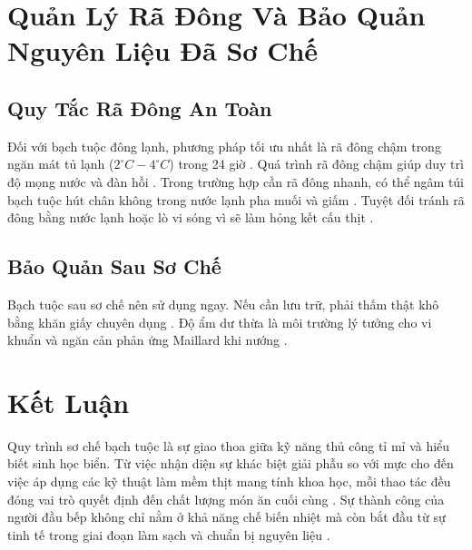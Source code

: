 \documentclass[12pt,a4paper]{report}
\begin{document}
\section{Quản Lý Rã Đông Và Bảo Quản Nguyên Liệu Đã Sơ Chế}

\subsection{Quy Tắc Rã Đông An Toàn}

Đối với bạch tuộc đông lạnh, phương pháp tối ưu nhất là rã đông chậm trong ngăn mát tủ lạnh ($2^\circ C - 4^\circ C$) trong 24 giờ \cite{ref4}. Quá trình rã đông chậm giúp duy trì độ mọng nước và đàn hồi \cite{ref4}. Trong trường hợp cần rã đông nhanh, có thể ngâm túi bạch tuộc hút chân không trong nước lạnh pha muối và giấm \cite{ref10}. Tuyệt đối tránh rã đông bằng nước lạnh hoặc lò vi sóng vì sẽ làm hỏng kết cấu thịt \cite{ref4}.

\subsection{Bảo Quản Sau Sơ Chế}

Bạch tuộc sau sơ chế nên sử dụng ngay. Nếu cần lưu trữ, phải thấm thật khô bằng khăn giấy chuyên dụng \cite{ref3}. Độ ẩm dư thừa là môi trường lý tưởng cho vi khuẩn và ngăn cản phản ứng Maillard khi nướng \cite{ref25}.

\section{Kết Luận}

Quy trình sơ chế bạch tuộc là sự giao thoa giữa kỹ năng thủ công tỉ mỉ và hiểu biết sinh học biển. Từ việc nhận diện sự khác biệt giải phẫu so với mực cho đến việc áp dụng các kỹ thuật làm mềm thịt mang tính khoa học, mỗi thao tác đều đóng vai trò quyết định đến chất lượng món ăn cuối cùng \cite{ref1}. Sự thành công của người đầu bếp không chỉ nằm ở khả năng chế biến nhiệt mà còn bắt đầu từ sự tinh tế trong giai đoạn làm sạch và chuẩn bị nguyên liệu \cite{ref3, ref4}.
\end{document}
